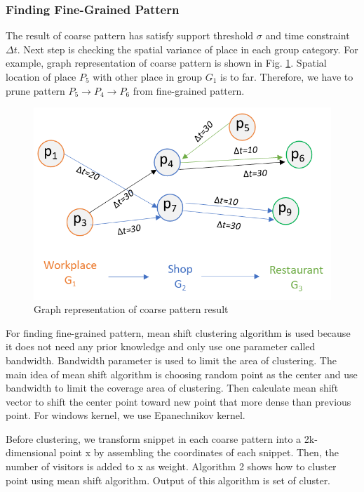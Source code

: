 \documentclass[conference]{IEEEtran}
\begin{document}
\subsubsection{Finding Fine-Grained Pattern}
The result of coarse pattern has satisfy support threshold $\sigma$ and time constraint $\Delta t$. Next step is checking the spatial variance of place in each group category. For example, graph representation of coarse pattern is shown in Fig. \ref{fig:graph-coarse-pattern}. Spatial location of place $P_{5}$ with other place in group $G_{1}$ is to far. Therefore, we have to prune pattern $P_{5}\rightarrow P_{4}\rightarrow P_{6}$ from fine-grained pattern. 

\begin{figure}[!h]
	\centering
	\includegraphics[width=0.7\linewidth]{graph_coarse_pattern}
	\caption{Graph representation of coarse pattern result}
	\label{fig:graph-coarse-pattern}
\end{figure}

For finding fine-grained pattern, mean shift clustering algorithm is used because it does not need any prior knowledge and only use one parameter called bandwidth. Bandwidth parameter is used to limit the area of clustering. The main idea of mean shift algorithm is choosing random point as the center and use bandwidth to limit the coverage area of clustering. Then calculate mean shift vector to shift the center point toward new point that more dense than previous point. For windows kernel, we use Epanechnikov kernel. 
\par
Before clustering, we transform snippet in each coarse pattern into a 2k-dimensional point x by assembling the coordinates of each snippet. Then, the number of visitors is added to x as weight. Algorithm 2 shows how to cluster point using mean shift algorithm. Output of this algorithm is set of cluster.
\end{document}
